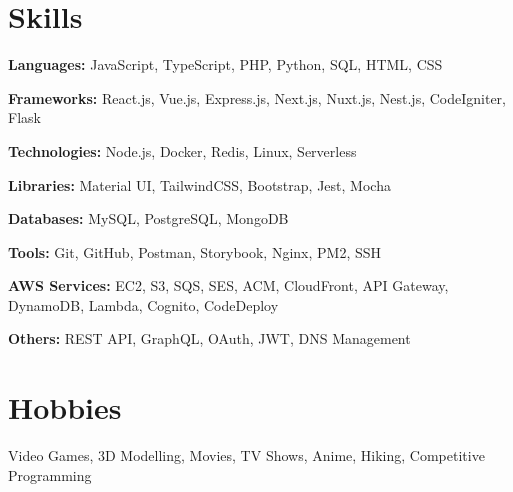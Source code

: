 \documentclass[letterpaper,12pt]{article}
\newcommand{\resumeSubHeadingListStart}{\begin{itemize}[leftmargin=0.15in, label={}]}
\newcommand{\resumeSubHeadingListEnd}{\end{itemize}}
\begin{document}
\section{Skills}
\vspace{2pt}
\resumeSubHeadingListStart
\small{\item{

                \textbf{Languages:}{ JavaScript, TypeScript, PHP, Python, SQL, HTML, CSS} \\ \vspace{3pt}

                \textbf{Frameworks:}{ React.js, Vue.js, Express.js, Next.js, Nuxt.js, Nest.js, CodeIgniter, Flask} \\ \vspace{3pt}

                \textbf{Technologies:}{ Node.js, Docker, Redis, Linux, Serverless} \\ \vspace{3pt}

                \textbf{Libraries:}{ Material UI, TailwindCSS, Bootstrap, Jest, Mocha} \\ \vspace{3pt}

                \textbf{Databases:}{ MySQL, PostgreSQL, MongoDB} \\ \vspace{3pt}

                \textbf{Tools:}{ Git, GitHub, Postman, Storybook, Nginx, PM2, SSH} \\ \vspace{3pt}

                \textbf{AWS Services:}{ EC2, S3, SQS, SES, ACM, CloudFront, API Gateway, DynamoDB, Lambda, Cognito, CodeDeploy} \\ \vspace{3pt}

                \textbf{Others:}{ REST API, GraphQL, OAuth, JWT, DNS Management} \\ \vspace{3pt}

          }}
\resumeSubHeadingListEnd


\section{Hobbies}
\resumeSubHeadingListStart
\small{\item{Video Games, 3D Modelling, Movies, TV Shows, Anime, Hiking, Competitive Programming }}
\resumeSubHeadingListEnd

\end{document}
